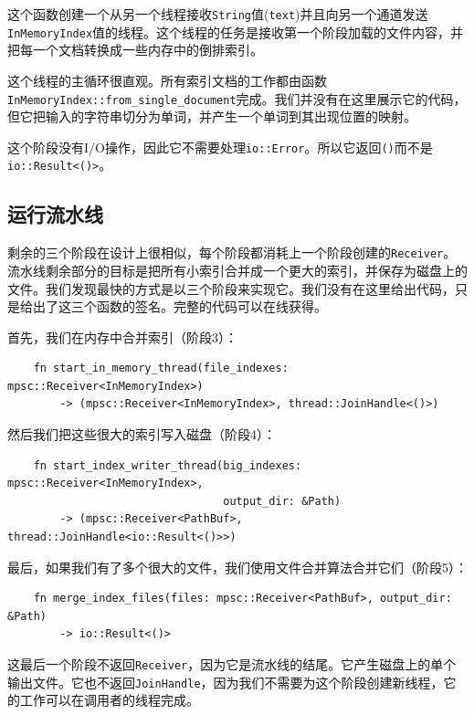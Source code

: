 这个函数创建一个从另一个线程接收\texttt{String}值(\texttt{text})并且向另一个通道发送\texttt{InMemoryIndex}值的线程。这个线程的任务是接收第一个阶段加载的文件内容，并把每一个文档转换成一些内存中的倒排索引。

这个线程的主循环很直观。所有索引文档的工作都由函数\texttt{InMemoryIndex::from\_single\_document}完成。我们并没有在这里展示它的代码，但它把输入的字符串切分为单词，并产生一个单词到其出现位置的映射。

这个阶段没有I/O操作，因此它不需要处理\texttt{io::Error}。所以它返回\texttt{()}而不是\texttt{io::Result<()>}。

\subsection{运行流水线}
剩余的三个阶段在设计上很相似，每个阶段都消耗上一个阶段创建的\texttt{Receiver}。流水线剩余部分的目标是把所有小索引合并成一个更大的索引，并保存为磁盘上的文件。我们发现最快的方式是以三个阶段来实现它。我们没有在这里给出代码，只是给出了这三个函数的签名。完整的代码可以在线获得。

首先，我们在内存中合并索引（阶段3）：
\begin{verbatim}
    fn start_in_memory_thread(file_indexes: mpsc::Receiver<InMemoryIndex>)
        -> (mpsc::Receiver<InMemoryIndex>, thread::JoinHandle<()>)
\end{verbatim}

然后我们把这些很大的索引写入磁盘（阶段4）：
\begin{verbatim}
    fn start_index_writer_thread(big_indexes: mpsc::Receiver<InMemoryIndex>,
                                 output_dir: &Path)
        -> (mpsc::Receiver<PathBuf>, thread::JoinHandle<io::Result<()>>)
\end{verbatim}

最后，如果我们有了多个很大的文件，我们使用文件合并算法合并它们（阶段5）：
\begin{verbatim}
    fn merge_index_files(files: mpsc::Receiver<PathBuf>, output_dir: &Path)
        -> io::Result<()>
\end{verbatim}

这最后一个阶段不返回\texttt{Receiver}，因为它是流水线的结尾。它产生磁盘上的单个输出文件。它也不返回\texttt{JoinHandle}，因为我们不需要为这个阶段创建新线程，它的工作可以在调用者的线程完成。

